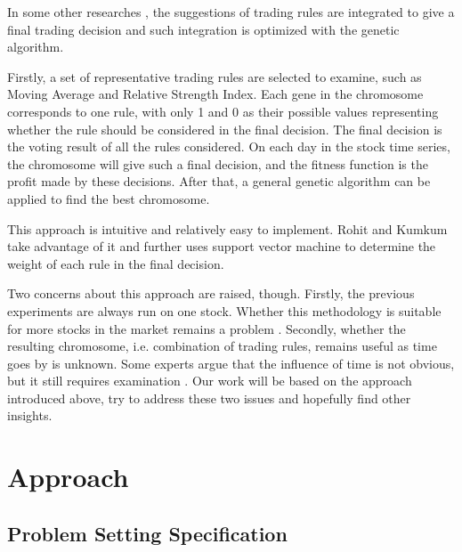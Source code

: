 \documentclass{article}
\begin{document}
In some other researches
\cite{genetic-algorithms-for-predicting-the-egyptian-stock-market}
\cite{stock-timing-using-genetic-algorithms}
, the suggestions of trading rules are integrated to give a final trading decision
and such integration is optimized with the genetic algorithm.

Firstly, a set of representative trading rules are selected to examine,
such as Moving Average and Relative Strength Index.
Each gene in the chromosome corresponds to one rule,
with only 1 and 0 as their possible values
representing whether the rule should be considered in the final decision.
The final decision is the voting result of all the rules considered.
On each day in the stock time series, the chromosome will give such a final decision,
and the fitness function is the profit made by these decisions.
After that, a general genetic algorithm can be applied to find the best chromosome.

This approach is intuitive and relatively easy to implement.
Rohit and Kumkum \cite{a-hybrid-machine-learning-system-for-stock-market-forecasting}
take advantage of it and further uses support vector machine
to determine the weight of each rule in the final decision.

Two concerns about this approach are raised, though.
Firstly, the previous experiments are always run on one stock.
Whether this methodology is suitable for more stocks in the market remains a problem
\cite{genetic-algorithms-for-predicting-the-egyptian-stock-market}.
Secondly, whether the resulting chromosome, i.e. combination of trading rules,
remains useful as time goes by is unknown.
Some experts argue that the influence of time is not obvious,
but it still requires examination
\cite{stock-timing-using-genetic-algorithms}.
Our work will be based on the approach introduced above,
try to address these two issues and hopefully find other insights.

\section{Approach}

\subsection{Problem Setting Specification}
\end{document}
